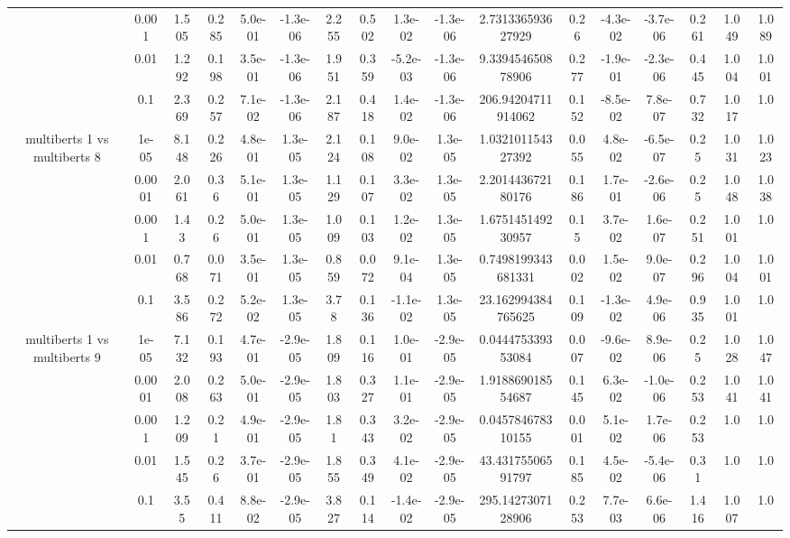 \begin{tabular}{|c|c|c|c|c|c|c|c|c|c|c|c|c|c|c|c|c|}
 & 0.001 & 1.505 & 0.285 & 5.0e-01 & -1.3e-06 & 2.255 & 0.502 & 1.3e-02 & -1.3e-06 & 2.731336593627929 & 0.26 & -4.3e-02 & -3.7e-06 & 0.261 & 1.049 & 1.089 \\
 & 0.01 & 1.292 & 0.198 & 3.5e-01 & -1.3e-06 & 1.951 & 0.359 & -5.2e-03 & -1.3e-06 & 9.339454650878906 & 0.277 & -1.9e-01 & -2.3e-06 & 0.445 & 1.004 & 1.001 \\
 & 0.1 & 2.369 & 0.257 & 7.1e-02 & -1.3e-06 & 2.187 & 0.418 & 1.4e-02 & -1.3e-06 & 206.94204711914062 & 0.152 & -8.5e-02 & 7.8e-07 & 0.732 & 1.017 & 1.0 \\
\hline
\multirow{5}{*}{multiberts 1 vs multiberts 8} & 1e-05 & 8.148 & 0.226 & 4.8e-01 & 1.3e-05 & 2.124 & 0.108 & 9.0e-02 & 1.3e-05 & 1.032101154327392 & 0.055 & 4.8e-02 & -6.5e-07 & 0.25 & 1.031 & 1.023 \\
 & 0.0001 & 2.061 & 0.36 & 5.1e-01 & 1.3e-05 & 1.129 & 0.107 & 3.3e-02 & 1.3e-05 & 2.201443672180176 & 0.186 & 1.7e-01 & -2.6e-06 & 0.25 & 1.048 & 1.038 \\
 & 0.001 & 1.43 & 0.26 & 5.0e-01 & 1.3e-05 & 1.009 & 0.103 & 1.2e-02 & 1.3e-05 & 1.675145149230957 & 0.15 & 3.7e-02 & 1.6e-07 & 0.251 & 1.001 & 1.0 \\
 & 0.01 & 0.768 & 0.071 & 3.5e-01 & 1.3e-05 & 0.859 & 0.072 & 9.1e-04 & 1.3e-05 & 0.7498199343681331 & 0.002 & 1.5e-02 & 9.0e-07 & 0.296 & 1.004 & 1.001 \\
 & 0.1 & 3.586 & 0.272 & 5.2e-02 & 1.3e-05 & 3.78 & 0.136 & -1.1e-02 & 1.3e-05 & 23.162994384765625 & 0.109 & -1.3e-02 & 4.9e-06 & 0.935 & 1.001 & 1.0 \\
\hline
\multirow{5}{*}{multiberts 1 vs multiberts 9} & 1e-05 & 7.132 & 0.193 & 4.7e-01 & -2.9e-05 & 1.809 & 0.116 & 1.0e-01 & -2.9e-05 & 0.044475339353084 & 0.007 & -9.6e-02 & 8.9e-06 & 0.25 & 1.028 & 1.047 \\
 & 0.0001 & 2.008 & 0.263 & 5.0e-01 & -2.9e-05 & 1.803 & 0.327 & 1.1e-01 & -2.9e-05 & 1.918869018554687 & 0.145 & 6.3e-02 & -1.0e-06 & 0.253 & 1.041 & 1.041 \\
 & 0.001 & 1.209 & 0.21 & 4.9e-01 & -2.9e-05 & 1.81 & 0.343 & 3.2e-02 & -2.9e-05 & 0.045784678310155 & 0.001 & 5.1e-02 & 1.7e-06 & 0.253 & 1.0 & 1.0 \\
 & 0.01 & 1.545 & 0.26 & 3.7e-01 & -2.9e-05 & 1.855 & 0.349 & 4.1e-02 & -2.9e-05 & 43.43175506591797 & 0.185 & 4.5e-02 & -5.4e-06 & 0.31 & 1.0 & 1.0 \\
 & 0.1 & 3.55 & 0.411 & 8.8e-02 & -2.9e-05 & 3.827 & 0.114 & -1.4e-02 & -2.9e-05 & 295.1427307128906 & 0.253 & 7.7e-03 & 6.6e-06 & 1.416 & 1.007 & 1.0 \\

\end{tabular}

